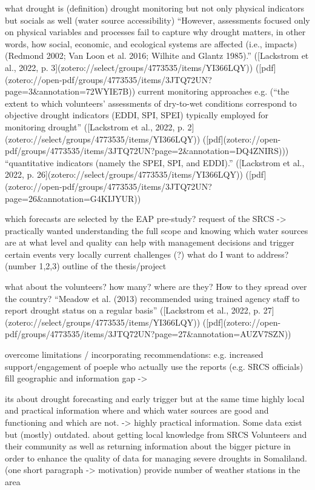 what drought is (definition)
drought monitoring but not only physical indicators but socials as well (water source accessibility) “However, assessments focused only on physical variables and processes fail to capture why drought matters, in other words, how social, economic, and ecological systems are affected (i.e., impacts) (Redmond 2002; Van Loon et al. 2016; Wilhite and Glantz 1985).” ([Lackstrom et al., 2022, p. 3](zotero://select/groups/4773535/items/YI366LQY)) ([pdf](zotero://open-pdf/groups/4773535/items/3JTQ72UN?page=3\&annotation=72WYIE7B))
current monitoring approaches e.g. (“the extent to which volunteers’ assessments of dry-to-wet conditions correspond to objective drought indicators (EDDI, SPI, SPEI) typically employed for monitoring drought” ([Lackstrom et al., 2022, p. 2](zotero://select/groups/4773535/items/YI366LQY)) ([pdf](zotero://open-pdf/groups/4773535/items/3JTQ72UN?page=2\&annotation=DQ4ZNIRS)))
“quantitative indicators (namely the SPEI, SPI, and EDDI).” ([Lackstrom et al., 2022, p. 26](zotero://select/groups/4773535/items/YI366LQY)) ([pdf](zotero://open-pdf/groups/4773535/items/3JTQ72UN?page=26\&annotation=G4KIJYUR))

which forecasts are selected by the EAP pre-study?
request of the SRCS -> practically wanted
understanding the full scope and knowing which water sources are at what level and quality can help with management decisions and trigger certain events very locally
current challenges (?) what do I want to address? (number 1,2,3)
outline of the thesis/project

what about the volunteers? how many? where are they? How to they spread over the country?
“Meadow et al. (2013) recommended using trained agency staff to report drought status on a regular basis” ([Lackstrom et al., 2022, p. 27](zotero://select/groups/4773535/items/YI366LQY)) ([pdf](zotero://open-pdf/groups/4773535/items/3JTQ72UN?page=27\&annotation=AUZV7SZN))

overcome limitations / incorporating recommendations: e.g. increased support/engagement of poeple who actually use the reports (e.g. SRCS officials) 
fill geographic and information gap ->

its about drought forecasting and early trigger but at the same time highly local and practical information where and which water sources are good and functioning and which are not. -> highly practical information. Some data exist but (mostly) outdated.
about getting local knowledge from SRCS Volunteers and their community as well as returning information about the bigger picture
in order to enhance the quality of data for managing severe droughts in Somaliland. (one short paragraph -> motivation)
provide number of weather stations in the area

